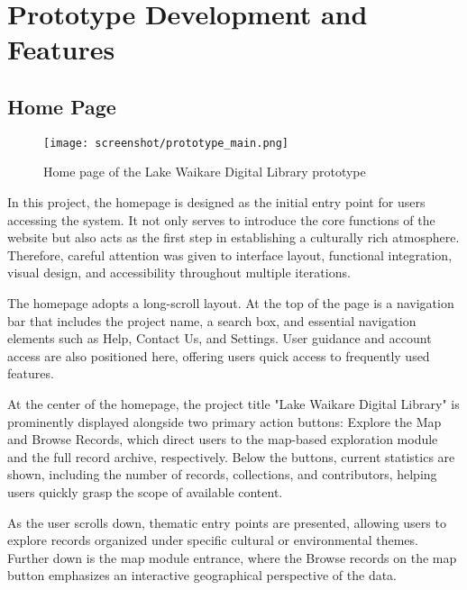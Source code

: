 ﻿%

\section{Prototype Development and Features}

\subsection{Home Page}

\begin{figure}[h]
    \centering
    \texttt{[image: screenshot/prototype\_main.png]}
    \caption{Home page of the Lake Waikare Digital Library prototype}
    \label{fig:prototype_main}
\end{figure}

In this project, the homepage is designed as the initial entry point for users accessing the system. It not only serves to introduce the core functions of the website but also acts as the first step in establishing a culturally rich atmosphere. Therefore, careful attention was given to interface layout, functional integration, visual design, and accessibility throughout multiple iterations.

The homepage adopts a long-scroll layout. At the top of the page is a navigation bar that includes the project name, a search box, and essential navigation elements such as Help, Contact Us, and Settings. User guidance and account access are also positioned here, offering users quick access to frequently used features.

At the center of the homepage, the project title "Lake Waikare Digital Library" is prominently displayed alongside two primary action buttons: Explore the Map and Browse Records, which direct users to the map-based exploration module and the full record archive, respectively. Below the buttons, current statistics are shown, including the number of records, collections, and contributors, helping users quickly grasp the scope of available content.

As the user scrolls down, thematic entry points are presented, allowing users to explore records organized under specific cultural or environmental themes. Further down is the map module entrance, where the Browse records on the map button emphasizes an interactive geographical perspective of the data.

